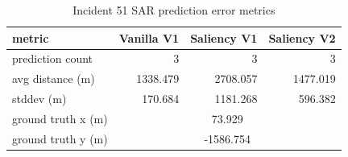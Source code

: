 \begin{table}[ht]
\centering
\caption{Incident 51 SAR prediction error metrics}
\label{tab:sar-incident-51}
\begin{tabular}{lrrr}
\hline
metric & Vanilla V1 & Saliency V1 & Saliency V2 \\
\hline
prediction count & 3 & 3 & 3 \\
avg distance (m) & 1338.479 & 2708.057 & 1477.019 \\
stddev (m) & 170.684 & 1181.268 & 596.382 \\
ground truth x (m) & \multicolumn{3}{c}{73.929} \\
ground truth y (m) & \multicolumn{3}{c}{-1586.754} \\
\hline
\end{tabular}
\end{table}
